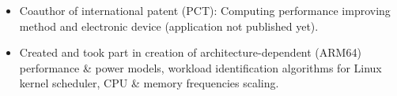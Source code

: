 
    \begin{itemize}
        \item Coauthor of international patent (PCT): Computing performance improving method and
            electronic device (application not published yet).
        \smallskip
        \item Created and took part in creation of architecture-dependent (ARM64) performance \& power models,
            workload identification algorithms for Linux kernel scheduler, CPU \& memory frequencies 
            scaling.
    \end{itemize}

    \smallskip

